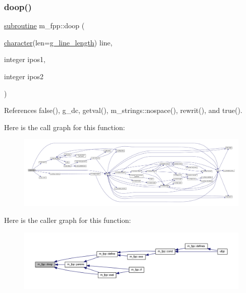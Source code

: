 \subsubsection{\texorpdfstring{doop()}{doop()}}
{\footnotesize\ttfamily \hyperlink{M__stopwatch_83_8txt_acfbcff50169d691ff02d4a123ed70482}{subroutine} m\+\_\+fpp\+::doop (\begin{DoxyParamCaption}\item[{\hyperlink{option__stopwatch_83_8txt_abd4b21fbbd175834027b5224bfe97e66}{character}(len=\hyperlink{namespacem__fpp_ab93f8756cf248cf8db932573009d4664}{g\+\_\+line\+\_\+length})}]{line,  }\item[{integer}]{ipos1,  }\item[{integer}]{ipos2 }\end{DoxyParamCaption})}



References false(), g\+\_\+dc, getval(), m\+\_\+strings\+::nospace(), rewrit(), and true().

Here is the call graph for this function\+:
\nopagebreak
\begin{figure}[H]
\begin{center}
\leavevmode
\includegraphics[width=350pt]{namespacem__fpp_a56d098fa1c69f9afbfbf0aacceed9fff_cgraph}
\end{center}
\end{figure}
Here is the caller graph for this function\+:
\nopagebreak
\begin{figure}[H]
\begin{center}
\leavevmode
\includegraphics[width=350pt]{namespacem__fpp_a56d098fa1c69f9afbfbf0aacceed9fff_icgraph}
\end{center}
\end{figure}
\mbox{\label{namespacem__fpp_aa7ce8afa566111e9b6f86922b9ec3205}} 

